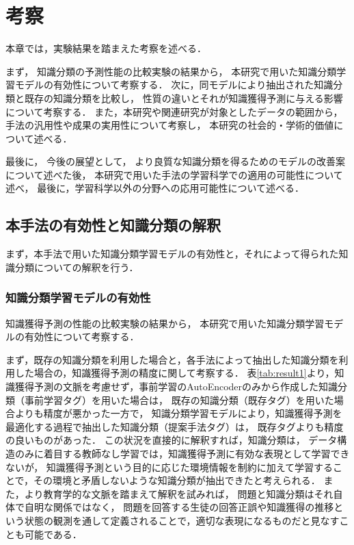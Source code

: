 \chapter{考察}
\label{chap:discussion}
\fancyhf{}
\rhead{\thepage}
\cfoot{\thepage}

本章では，実験結果を踏まえた考察を述べる．

まず，
知識分類の予測性能の比較実験の結果から，
本研究で用いた知識分類学習モデルの有効性について考察する．
次に，同モデルにより抽出された知識分類と既存の知識分類を比較し，
性質の違いとそれが知識獲得予測に与える影響について考察する．
また，本研究や関連研究が対象としたデータの範囲から，
手法の汎用性や成果の実用性について考察し，
本研究の社会的・学術的価値について述べる．

最後に，
今後の展望として，
より良質な知識分類を得るためのモデルの改善案について述べた後，
本研究で用いた手法の学習科学での適用の可能性について述べ，
最後に，学習科学以外の分野への応用可能性について述べる．

\section{本手法の有効性と知識分類の解釈}
まず，本手法で用いた知識分類学習モデルの有効性と，それによって得られた知識分類についての解釈を行う．


\subsection{知識分類学習モデルの有効性}
知識獲得予測の性能の比較実験の結果から，
本研究で用いた知識分類学習モデルの有効性について考察する．


まず，既存の知識分類を利用した場合と，各手法によって抽出した知識分類を利用した場合の，知識獲得予測の精度に関して考察する．
表\ref{tab:result1}より，知識獲得予測の文脈を考慮せず，事前学習のAutoEncoderのみから作成した知識分類（事前学習タグ）を用いた場合は，
既存の知識分類（既存タグ）を用いた場合よりも精度が悪かった一方で，
知識分類学習モデルにより，知識獲得予測を最適化する過程で抽出した知識分類（提案手法タグ）は，
既存タグよりも精度の良いものがあった．
この状況を直接的に解釈すれば，知識分類は，
データ構造のみに着目する教師なし学習では，知識獲得予測に有効な表現として学習できないが，
知識獲得予測という目的に応じた環境情報を制約に加えて学習することで，その環境と矛盾しないような知識分類が抽出できたと考えられる．
また，より教育学的な文脈を踏まえて解釈を試みれば，
問題と知識分類はそれ自体で自明な関係ではなく，
問題を回答する生徒の回答正誤や知識獲得の推移という状態の観測を通して定義されることで，適切な表現になるものだと見なすことも可能である．

